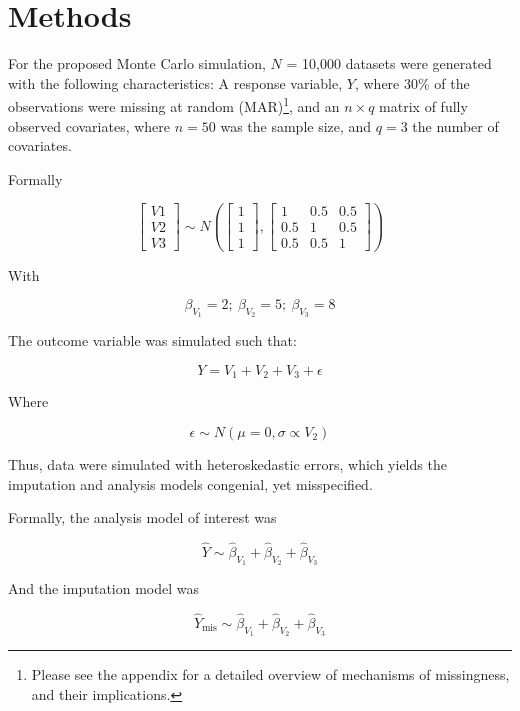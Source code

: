 \documentclass[
  letterpaper,
  DIV=11,
  numbers=noendperiod]{scrreprt}
\begin{document}

\hypertarget{methods}{%
\chapter{Methods}\label{methods}}

For the proposed Monte Carlo simulation, \(N\) = 10,000 datasets were
generated with the following characteristics: A response variable,
\(Y\), where 30\% of the observations were missing at random
(MAR)\footnote{Please see the appendix for a detailed overview of
  mechanisms of missingness, and their implications.}, and an
\(n \times q\) matrix of fully observed covariates, where \(n = 50\) was
the sample size, and \(q = 3\) the number of covariates.

Formally

\[
\begin{bmatrix} V1 \\V2 \\ V3 \end{bmatrix} \sim N\left(\begin{bmatrix} 1\\ 1 \\ 1 \end{bmatrix}, \begin{bmatrix} 1 & 0.5 & 0.5 \\
0.5 & 1 & 0.5 \\
0.5 & 0.5 & 1
\end{bmatrix}\right)
\]

With

\[
\beta_{V_1} = 2 ; \  \beta_{V_2} = 5 ; \ \beta_{V_3} = 8
\]

The outcome variable was simulated such that:

\[
Y = V_1 + V_2 + V_3 + \epsilon
\]

Where

\[
\epsilon \sim N(\mu = 0, \sigma \propto V_2)
\]

Thus, data were simulated with heteroskedastic errors, which yields the
imputation and analysis models congenial, yet misspecified.

Formally, the analysis model of interest was

\[
\widehat{Y} \sim \widehat{\beta}_{V_1} + \widehat{\beta}_{V_2} + \widehat{\beta}_{V_3} 
\]

And the imputation model was

\[
\widehat{Y}_{\text{mis}} \sim \widehat{\beta}_{V_1} + \widehat{\beta}_{V_2} + \widehat{\beta}_{V_3}
\]
\end{document}
